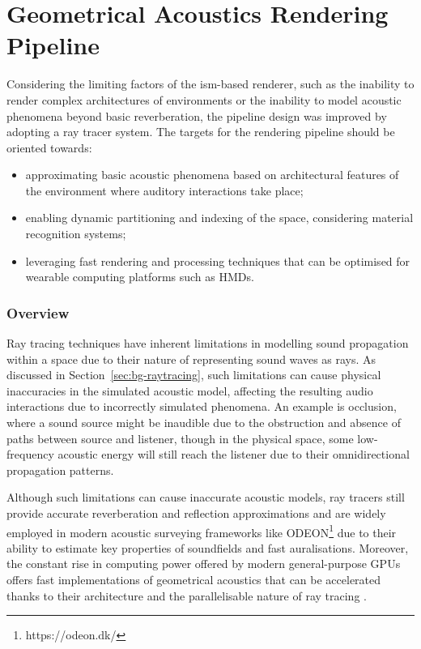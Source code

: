 \section{Geometrical Acoustics Rendering Pipeline}\label{sec:ga-based-pipeline}
Considering the limiting factors of the \acrshort{ism}-based renderer, such as the inability to render complex architectures of environments or the inability to model acoustic phenomena beyond basic reverberation, the pipeline design was improved by adopting a ray tracer system. The targets for the rendering pipeline should be oriented towards: 
\begin{itemize}
    \item approximating basic acoustic phenomena based on architectural features of the environment where auditory interactions take place;
    \item enabling dynamic partitioning and indexing of the space, considering material recognition systems; 
    \item leveraging fast rendering and processing techniques that can be optimised for wearable computing platforms such as HMDs.
\end{itemize}


\subsubsection{Overview}
Ray tracing techniques have inherent limitations in modelling sound propagation within a space due to their nature of representing sound waves as rays. As discussed in Section~\ref{sec:bg-raytracing}, such limitations can cause physical inaccuracies in the simulated acoustic model, affecting the resulting audio interactions due to incorrectly simulated phenomena. An example is occlusion, where a sound source might be inaudible due to the obstruction and absence of paths between source and listener, though in the physical space, some low-frequency acoustic energy will still reach the listener due to their omnidirectional propagation patterns. \par
Although such limitations can cause inaccurate acoustic models, ray tracers still provide accurate reverberation and reflection approximations and are widely employed in modern acoustic surveying frameworks like ODEON\footnote{https://odeon.dk/} due to their ability to estimate key properties of soundfields and fast auralisations. Moreover, the constant rise in computing power offered by modern general-purpose GPUs offers fast implementations of geometrical acoustics that can be accelerated thanks to their architecture and the parallelisable nature of ray tracing \citep{savioja2010use}. \par

